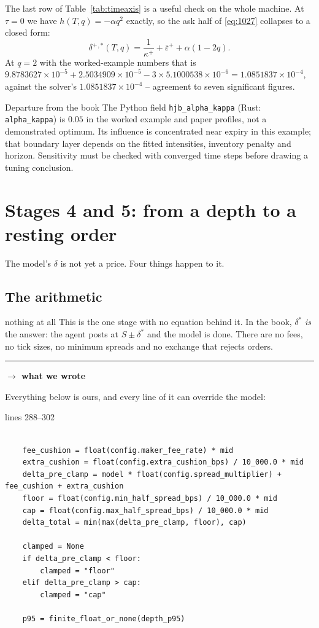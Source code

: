 \documentclass[11pt,a4paper]{article}
\newcommand{\wecode}{\par\vspace{4pt}\noindent
  \textcolor{NavyLink}{\rule{\linewidth}{0.4pt}}\par\vspace{3pt}
  \noindent\textbf{\textcolor{NavyLink}{$\rightarrow$ what we wrote}}\par\vspace{2pt}}
\newcommand{\dplus}{\delta^{+}}
\newcommand{\epsb}{\bar{\varepsilon}}
\newcommand{\code}[1]{\texttt{\small #1}}
\newcommand{\snip}[3]{%
  \par\addvspace{6pt}\noindent
  {\footnotesize\color{NavyLink}\texttt{\detokenize{#1}}\quad lines #2--#3}%
  \par\nobreak\vspace{1pt}}
\begin{document}
The last row of Table~\ref{tab:timeaxis} is a useful check on the whole machine. At $\tau = 0$ we have
$h(T,q) = -\alpha q^{2}$ exactly, so the ask half of \eqref{eq:1027} collapses to
a closed form:
\[
  \dplus{}^{,*}(T,q) = \frac{1}{\kappa^{+}} + \epsb^{+} + \alpha(1-2q).
\]
At $q=2$ with the worked-example numbers that is
$9.8783627\times10^{-5} + 2.5034909\times10^{-5}
- 3\times5.1000538\times10^{-6} = 1.0851837\times10^{-4}$, against the solver's $1.0851837\times10^{-4}$ --
agreement to seven significant figures.

\begin{departure}{Departure from the book}
The Python field \code{hjb\_alpha\_kappa} (Rust: \code{alpha\_kappa}) is
$0.05$ in the worked example and paper profiles, not a demonstrated optimum.
Its influence is concentrated near expiry in this example; that boundary layer
depends on the fitted intensities, inventory penalty and horizon. Sensitivity
must be checked with converged time steps before drawing a tuning conclusion.
\end{departure}

\section{Stages 4 and 5: from a depth to a resting order}
\label{sec:assembly}

The model's $\delta$ is not yet a price. Four things happen to it.

\subsection{The arithmetic}

\begin{booktocode}{nothing at all}
This is the one stage with no equation behind it. In the book, $\delta^{*}$
\emph{is} the answer: the agent posts at $S \pm \delta^{*}$ and the model is
done. There are no fees, no tick sizes, no minimum spreads and no exchange that
rejects orders.
\wecode
Everything below is ours, and every line of it can override the model:
\end{booktocode}

\snip{scripts/mm_core.py}{288}{302}
\begin{lstlisting}

    fee_cushion = float(config.maker_fee_rate) * mid
    extra_cushion = float(config.extra_cushion_bps) / 10_000.0 * mid
    delta_pre_clamp = model * float(config.spread_multiplier) + fee_cushion + extra_cushion
    floor = float(config.min_half_spread_bps) / 10_000.0 * mid
    cap = float(config.max_half_spread_bps) / 10_000.0 * mid
    delta_total = min(max(delta_pre_clamp, floor), cap)

    clamped = None
    if delta_pre_clamp < floor:
        clamped = "floor"
    elif delta_pre_clamp > cap:
        clamped = "cap"

    p95 = finite_float_or_none(depth_p95)
\end{lstlisting}
\end{document}
